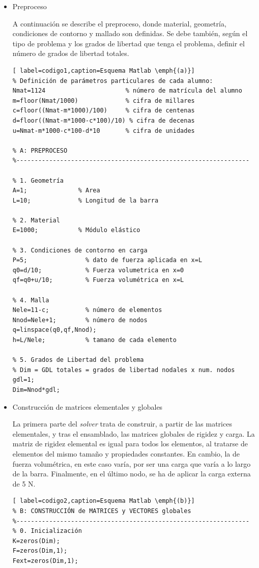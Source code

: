 \documentclass[spanish,a4paper,12pt]{article}
\begin{document}
\begin{itemize}
\item Preproceso

A continuación se describe el preproceso, donde material, geometría, condiciones de contorno y mallado son definidas. Se debe también, según el tipo de problema y los grados de libertad que tenga el problema, definir el número de grados de libertad totales.


\begin{lstlisting}[ label=codigo1,caption=Esquema Matlab \emph{(a)}]
% Definición de parámetros particulares de cada alumno:
Nmat=1124                      % número de matrícula del alumno
m=floor(Nmat/1000)             % cifra de millares
c=floor((Nmat-m*1000)/100)     % cifra de centenas
d=floor((Nmat-m*1000-c*100)/10) % cifra de decenas
u=Nmat-m*1000-c*100-d*10       % cifra de unidades

% A: PREPROCESO
%----------------------------------------------------------------

% 1. Geometría
A=1;              % Area
L=10;             % Longitud de la barra

% 2. Material
E=1000;           % Módulo elástico

% 3. Condiciones de contorno en carga
P=5;                % dato de fuerza aplicada en x=L
q0=d/10;            % Fuerza volumetrica en x=0
qf=q0+u/10;         % Fuerza volumétrica en x=L

% 4. Malla
Nele=11-c;          % número de elementos
Nnod=Nele+1;        % número de nodos
q=linspace(q0,qf,Nnod);
h=L/Nele;			% tamano de cada elemento

% 5. Grados de Libertad del problema
% Dim = GDL totales = grados de libertad nodales x num. nodos
gdl=1;
Dim=Nnod*gdl;

\end{lstlisting}

\item Construcción de matrices elementales y globales

La primera parte del \textit{solver} trata de construir, a partir de las matrices elementales, y tras el ensamblado, las matrices globales de rigidez y carga. La matriz de rigidez elemental es igual para todos los elementos, al tratarse de elementos del mismo tamaño y propiedades constantes. En cambio, la de fuerza volumétrica, en este caso varía, por ser una carga que varía a lo largo de la barra. Finalmente, en el último nodo, se ha de aplicar la carga externa de 5 N.

\begin{lstlisting}[ label=codigo2,caption=Esquema Matlab \emph{(b)}]
% B: CONSTRUCCIÓN de MATRICES y VECTORES globales
%----------------------------------------------------------------
% 0. Inicialización
K=zeros(Dim);
F=zeros(Dim,1);
Fext=zeros(Dim,1); 


\end{lstlisting}
\end{itemize}
\end{document}
